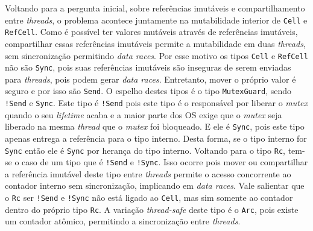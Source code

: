 Voltando para a pergunta inicial, sobre referências imutáveis e compartilhamento entre \textit{threads}, o problema acontece juntamente na mutabilidade interior de \texttt{Cell} e \texttt{RefCell}. Como é possível ter valores mutáveis através de referências imutáveis, compartilhar essas referências imutáveis permite a mutabilidade em duas \textit{threads}, sem sincronização permitindo \textit{data races}. Por esse motivo os tipos \texttt{Cell} e \texttt{RefCell} não são \texttt{Sync}, pois suas referências imutáveis são inseguras de serem enviadas para \textit{threads}, pois podem gerar \textit{data races}. Entretanto, mover o próprio valor é seguro e por isso são \texttt{Send}. O espelho destes tipos é o tipo \texttt{MutexGuard}, sendo \texttt{!Send} e \texttt{Sync}. Este tipo é \texttt{!Send} pois este tipo é o responsável por liberar o \textit{mutex} quando o seu \textit{lifetime} acaba e a maior parte dos \ac{OS} exige que o \textit{mutex} seja liberado na mesma \textit{thread} que o \textit{mutex} foi bloqueado. E ele é \texttt{Sync}, pois este tipo apenas entrega a referência para o tipo interno. Desta forma, se o tipo interno for \texttt{Sync} então ele é \texttt{Sync} por herança do tipo interno. Voltando para o tipo \texttt{Rc}, tem-se o caso de um tipo que é \texttt{!Send} e \texttt{!Sync}. Isso ocorre pois mover ou compartilhar a referência imutável deste tipo entre \textit{threads} permite o acesso concorrente ao contador interno sem sincronização, implicando em \textit{data races}. Vale salientar que o \texttt{Rc} ser \texttt{!Send} e \texttt{!Sync} não está ligado ao \texttt{Cell}, mas sim somente ao contador dentro do próprio tipo \texttt{Rc}. A variação \textit{thread-safe} deste tipo é o \texttt{Arc}, pois existe um contador atômico, permitindo a sincronização entre \textit{threads}.

